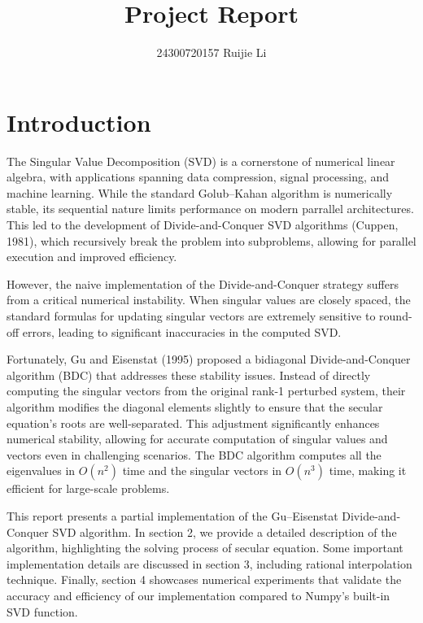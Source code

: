 \documentclass[12pt]{article}
\begin{document}
 
 
\title{Project Report}
\author{24300720157 Ruijie Li}

\maketitle

\tableofcontents
\newpage

\section{Introduction}

The Singular Value Decomposition (SVD) is a cornerstone of numerical linear algebra, with applications spanning data compression, signal processing, and machine learning. While the standard Golub--Kahan algorithm is numerically stable, its sequential nature limits performance on modern parrallel architectures. This led to the development of Divide-and-Conquer SVD algorithms (Cuppen, 1981), which recursively break the problem into subproblems, allowing for parallel execution and improved efficiency.

However, the naive implementation of the Divide-and-Conquer strategy suffers from a critical numerical instability. When singular values are closely spaced, the standard formulas for updating singular vectors are extremely sensitive to round-off errors, leading to significant inaccuracies in the computed SVD.

Fortunately, Gu and Eisenstat (1995) proposed a bidiagonal Divide-and-Conquer algorithm (BDC) that addresses these stability issues. Instead of directly computing the singular vectors from the original rank-1 perturbed system, their algorithm modifies the diagonal elements slightly to ensure that the secular equation's roots are well-separated. This adjustment significantly enhances numerical stability, allowing for accurate computation of singular values and vectors even in challenging scenarios. The BDC algorithm computes all the eigenvalues in \(O(n^2)\) time and the singular vectors in \(O(n^3)\) time, making it efficient for large-scale problems.

This report presents a partial implementation of the Gu--Eisenstat Divide-and-Conquer SVD algorithm. In section 2, we provide a detailed description of the algorithm, highlighting the solving process of secular equation. Some important implementation details are discussed in section 3, including rational interpolation technique. Finally, section 4 showcases numerical experiments that validate the accuracy and efficiency of our implementation compared to Numpy's built-in SVD function.
\end{document}
